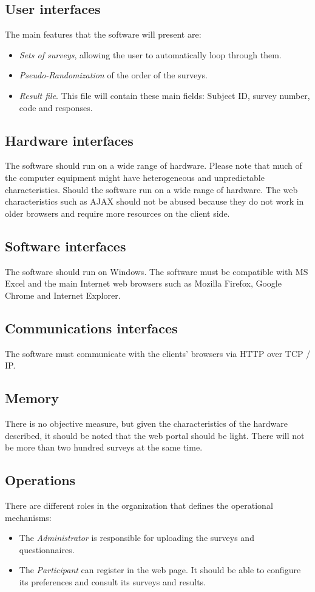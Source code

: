 \documentclass[a4paper,12pt,oneside]{report}
\begin{document}
\subsection{User interfaces}
The main features that the software will present are:
\begin{itemize}
\item {\it Sets of surveys}, allowing the user to automatically loop through them.
\item {\it Pseudo-Randomization} of the order of the surveys.
\item {\it Result file}. This file will contain these main fields: Subject ID, survey number, code and responses.
\end{itemize}

\subsection{Hardware interfaces}
The software should run on a wide range of hardware. Please note that much of the computer equipment might have heterogeneous and unpredictable characteristics. Should the software run on a wide range of hardware. The web characteristics such as AJAX should not be abused because they do not work in older browsers and require more resources on the client side.

\subsection{Software interfaces}
The software should run on Windows. The software must be compatible with MS Excel and the main Internet web browsers such as Mozilla Firefox, Google Chrome and Internet Explorer.

\subsection{Communications interfaces}
The software must communicate with the clients' browsers via HTTP over TCP / IP.
\subsection{Memory}
There is no objective measure, but given the characteristics of the hardware described, it should be noted that the web portal should be light. There will not be more than two hundred surveys at the same time.


\subsection{Operations}
There are different roles in the organization that defines the operational mechanisms:
\begin{itemize}
\item The {\it Administrator} is responsible for uploading the surveys and questionnaires.
\item The {\it Participant} can register in the web page. It should be able to configure its preferences and consult its surveys and results.
\end{itemize}
\end{document}
